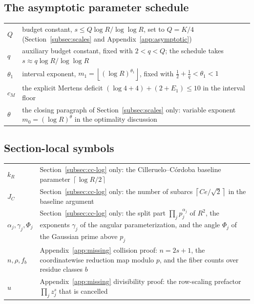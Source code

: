 \documentclass[11pt]{article}
\newcommand{\floor}[1]{\left\lfloor #1 \right\rfloor}
\newcommand{\ceil}[1]{\left\lceil #1 \right\rceil}
\begin{document}
\subsection*{The asymptotic parameter schedule}

\begin{center}
\begin{tabular}{@{}lp{}@{}}
\(Q\) & budget constant, \(s\le Q\log R/\log\log R\), set to \(Q=K/4\) (Section~\ref{subsec:scales} and Appendix~\ref{app:asymptotic}) \\
\(q\) & auxiliary budget constant, fixed with \(2<q<Q\); the schedule takes \(s\approx q\log R/\log\log R\) \\
\(\theta_1\) & interval exponent, \(m_1=\floor{(\log R)^{\theta_1}}\), fixed with \(\tfrac12+\tfrac1q<\theta_1<1\) \\
\(c_M\) & the explicit Mertens deficit \((\log4+4)+(2+E_1)\le10\) in the interval floor \\
\(\theta\) & the closing paragraph of Section~\ref{subsec:scales} only: variable exponent \(m_0=(\log R)^{\theta}\) in the optimality discussion \\
\end{tabular}
\end{center}

\subsection*{Section-local symbols}

\begin{center}
\begin{tabular}{@{}lp{}@{}}
\(k_R\) & Section~\ref{subsec:cc-log} only: the Cilleruelo--C\'ordoba baseline parameter \(\ceil{\log R/2}\) \\
\(J_C\) & Section~\ref{subsec:cc-log} only: the number of subarcs \(\ceil{Ce/\sqrt2}\) in the baseline argument \\
\(\alpha_j,\gamma_j,\Phi_j\) & Section~\ref{subsec:cc-log} only: the split part \(\prod_j p_j^{\alpha_j}\) of \(R^2\), the exponents \(\gamma_j\) of the angular parameterization, and the angle \(\Phi_j\) of the Gaussian prime above \(p_j\) \\
\(n,\rho,f_b\) & Appendix~\ref{app:missing} collision proof: \(n=2s+1\), the coordinatewise reduction map modulo \(p\), and the fiber counts over residue classes \(b\) \\
\(u\) & Appendix~\ref{app:missing} divisibility proof: the row-scaling prefactor \(\prod_j z_j^s\) that is cancelled
\end{tabular}
\end{center}
\end{document}

